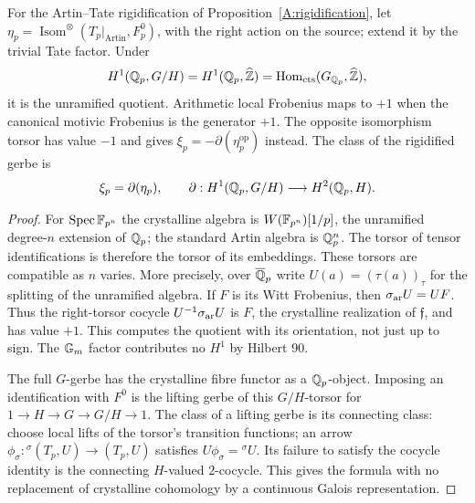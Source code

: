 \begin{proposition}
\label{A:eta}
For the Artin--Tate rigidification of Proposition~\ref{A:rigidification},
let $\eta_p=\operatorname{Isom}^{\otimes}(T_p|_{\mathrm{Artin}},F^0_p)$,
with the right action on the source; extend it by the trivial Tate
factor. Under
\[
 H^1(\mathbb Q_p,G/H)=H^1(\mathbb Q_p,\widehat{\mathbb Z})
       =\operatorname{Hom}_{\rm cts}(G_{\mathbb Q_p},\widehat{\mathbb Z}),
\]
it is the unramified quotient. Arithmetic local Frobenius maps to
$+1$ when the canonical motivic Frobenius is the generator $+1$.
The opposite isomorphism torsor has value $-1$ and gives
$\xi_p=-\partial(\eta_p^{\mathrm{op}})$ instead.
The class of the rigidified gerbe is
\[
 \xi_p=\partial(\eta_p),\qquad
 \partial:H^1(\mathbb Q_p,G/H)\longrightarrow H^2(\mathbb Q_p,H).
\]
\end{proposition}
\begin{proof}
For $\operatorname{Spec}\mathbb F_{p^n}$ the crystalline algebra is
$W(\mathbb F_{p^n})[1/p]$, the unramified degree-$n$ extension of
$\mathbb Q_p$; the standard Artin algebra is $\mathbb Q_p^n$. The torsor
of tensor identifications is therefore the torsor of its embeddings.
These torsors are compatible as $n$ varies. More precisely, over
$\overline{\mathbb Q}_p$ write $U(a)=(\tau(a))_\tau$ for the splitting
of the unramified algebra. If $F$ is its Witt Frobenius, then
$\sigma_{\rm ar}U=UF$. Thus the right-torsor cocycle
$U^{-1}\sigma_{\rm ar}U$ is $F$, the crystalline realization of
$\mathfrak f$, and has value $+1$. This computes the quotient
with its orientation, not just up to sign. The ${\mathbb G_m}$ factor contributes no
$H^1$ by Hilbert 90.

The full $G$-gerbe has the crystalline fibre functor as a
$\mathbb Q_p$-object. Imposing an identification with $F^0$ is the
lifting gerbe of this $G/H$-torsor for
$1\to H\to G\to G/H\to1$. The class of a lifting gerbe is
its connecting class: choose local lifts of the torsor's transition
functions; an arrow $\phi_\sigma:{}^\sigma(T_p,U)\to(T_p,U)$
satisfies $U\phi_\sigma={}^\sigma U$. Its failure to satisfy
the cocycle identity is the connecting $H$-valued $2$-cocycle.
This gives the formula with no replacement
of crystalline cohomology by a continuous Galois representation.
\end{proof}

